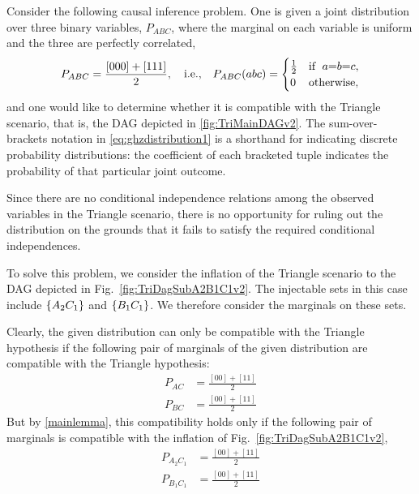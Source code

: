 Consider the following causal inference problem.  One is given a joint distribution over three binary variables, $P_{A B C}$, where the marginal on each variable is uniform and the three are perfectly correlated,
\begin{align}\label{eq:ghzdistribution1}
P_{A B C} =\frac{[000]+[111]}{2},\quad\text{i.e.,}\quad P_{A B C}(a b c)=\begin{cases}\tfrac{1}{2}&\text{if }\; a\mathord{=} b\mathord{=} c, \\ 0&\text{otherwise},\end{cases}
\end{align}
and one would like to determine whether it is compatible with the Triangle scenario, that is, the DAG depicted in \cref{fig:TriMainDAGv2}.  The sum-over-brackets notation in \cref{eq:ghzdistribution1} is a shorthand for indicating discrete probability distributions: the coefficient of each bracketed tuple indicates the probability of that particular joint outcome.

Since there are no conditional independence relations among the observed variables in the Triangle scenario, there is no opportunity for ruling out the distribution on the grounds that it fails to satisfy the required conditional independences. 


To solve this problem, we consider the inflation of the Triangle scenario to the DAG depicted in Fig.~\ref{fig:TriDagSubA2B1C1v2}.  
The injectable sets in this case include $\left\lbrace A_2 C_1\right\rbrace$ and $\left\lbrace B_1 C_1\right\rbrace$.  We therefore consider the marginals on these sets.

Clearly, the given distribution can only be compatible with the Triangle hypothesis if the following pair of marginals of the given distribution are compatible with the Triangle hypothesis:
\begin{align*}
P_{A C} &= \frac{[00]+[11]}{2}\\
P_{B C} &= \frac{[00]+[11]}{2}
\end{align*}
But by \cref{mainlemma}, this compatibility holds only if the following pair of marginals is compatible with the inflation of Fig.~\ref{fig:TriDagSubA2B1C1v2},
\begin{align*}
P_{A_2 C_1} &= \frac{[00]+[11]}{2} \\
P_{B_1 C_1} &= \frac{[00]+[11]}{2} 
\end{align*}


